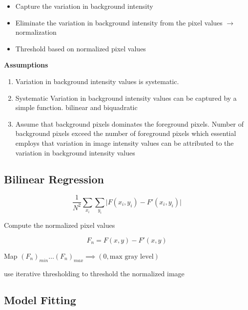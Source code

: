 \documentclass[11pt]{article}
\theoremstyle{definition}
\begin{document}
\begin{itemize}
    \item Capture the variation in background intensity
    \item Eliminate the variation in background intensity from the pixel values $\longrightarrow$ normalization
    \item Threshold based on normalized pixel values
\end{itemize}

\textbf{Assumptions}

\begin{enumerate}
    \item Variation in background intensity values is systematic.
    
    \item Systematic Variation in background intensity values can be captured by a simple function. bilinear and biquadratic
    
    \item Assume that background pixels dominates the foreground pixels. Number of background pixels exceed the number of foreground pixels which essential employs that variation in image intensity values can be attributed to the variation in background intensity values
\end{enumerate}


\subsection{Bilinear Regression}

\begin{equation}
\frac{1}{N^2}
\sum_{x_i}
\sum_{y_i}
\vert F(x_i, y_i) - F'(x_i, y_i) \vert
\end{equation}

\newpage

Compute the normalized pixel values

\[
F_n = F(x, y) - F'(x, y)
\]

Map $(F_n)_{min} \ldots (F_n)_{max} \implies (0, \text{max gray level})$

use iterative thresholding to threshold the normalized image


\subsection{Model Fitting}
\end{document}
